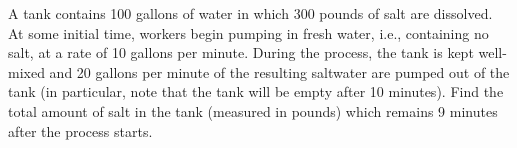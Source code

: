 \documentclass{ximera}
\begin{document}
\begin{question}%

A tank contains 100 gallons of water in which 300 pounds of salt are dissolved. At some initial time, workers begin pumping in fresh water, i.e., containing no salt, at a rate of 10 gallons per minute. During the process, the tank is kept well-mixed and 20 gallons per minute of the resulting saltwater are pumped out of the tank (in particular, note that the tank will be empty after 10 minutes). Find the total amount of salt in the tank (measured in pounds) which remains 9 minutes after the process starts.
\begin{multiplechoice}
\end{multiplechoice}

\end{question}
\end{document}
